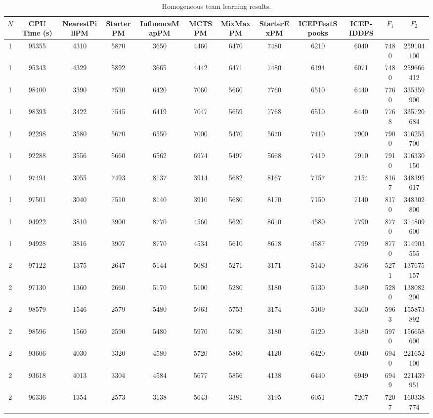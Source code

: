 \documentclass[journal]{IEEEtran}
\begin{document}
\begin{table}
\caption{Homogeneous team learning results.}
\label{tab:results_homogeneous}
\centering
\footnotesize
\begin{tabular}{|cc|cccccccc|cc|}
\hline																							
$N$	&	CPU Time (s)	&	NearestPillPM	&	StarterPM	&	InfluenceMapPM	&	MCTSPM	&	MixMaxPM	&	StarterExPM	&	ICEPFeatSpooks	&	ICEP-IDDFS	&	$F_1$	&	$F_2$	\\
\hline																							
1	&	95355	&	4310	&	5870	&	3650	&	4460	&	6470	&	7480	&	6210	&	6040	&	7480	&	259104100	\\
1	&	95343	&	4329	&	5892	&	3665	&	4442	&	6471	&	7480	&	6194	&	6071	&	7480	&	259666412	\\
1	&	98400	&	3390	&	7530	&	6420	&	7060	&	5660	&	7760	&	6510	&	6440	&	7760	&	335359900	\\
1	&	98393	&	3422	&	7545	&	6419	&	7047	&	5659	&	7768	&	6510	&	6440	&	7768	&	335720684	\\
1	&	92298	&	3580	&	5670	&	6550	&	7000	&	5470	&	5670	&	7410	&	7900	&	7900	&	316255700	\\
1	&	92288	&	3556	&	5660	&	6562	&	6974	&	5497	&	5668	&	7419	&	7910	&	7910	&	316330150	\\
1	&	97494	&	3055	&	7493	&	8137	&	3914	&	5682	&	8167	&	7157	&	7154	&	8167	&	348395617	\\
1	&	97501	&	3040	&	7510	&	8140	&	3910	&	5680	&	8170	&	7150	&	7140	&	8170	&	348302800	\\
1	&	94922	&	3810	&	3900	&	8770	&	4560	&	5620	&	8610	&	4580	&	7790	&	8770	&	314809600	\\
1	&	94928	&	3816	&	3907	&	8770	&	4534	&	5610	&	8618	&	4587	&	7799	&	8770	&	314903555	\\
\hline																							
2	&	97122	&	1375	&	2647	&	5144	&	5083	&	5271	&	3171	&	5140	&	3496	&	5271	&	137675157	\\
2	&	97130	&	1360	&	2660	&	5170	&	5100	&	5280	&	3180	&	5130	&	3480	&	5280	&	138082200	\\
2	&	98579	&	1546	&	2579	&	5480	&	5963	&	5753	&	3174	&	5109	&	3460	&	5963	&	155873892	\\
2	&	98596	&	1560	&	2590	&	5480	&	5970	&	5780	&	3180	&	5120	&	3480	&	5970	&	156658600	\\
2	&	93606	&	4030	&	3320	&	4580	&	5720	&	5860	&	4120	&	6420	&	6940	&	6940	&	221652100	\\
2	&	93618	&	4013	&	3304	&	4584	&	5677	&	5856	&	4138	&	6440	&	6949	&	6949	&	221439951	\\
2	&	96336	&	1354	&	2573	&	3138	&	5643	&	3381	&	3195	&	6051	&	7207	&	7207	&	160338774	\\

\end{tabular}
\end{table}
\end{document}

